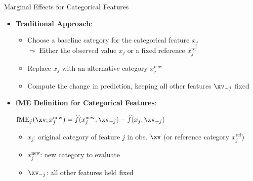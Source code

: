 \documentclass[11pt,compress,t,notes=noshow, aspectratio=169, xcolor=table]{beamer}
\begin{document}
\begin{frame}{Marginal Effects for Categorical Features}
\begin{itemize}
\item \textbf{Traditional Approach}:
\begin{itemize}
  \item Choose a baseline category for the categorical feature \(x_j\) \\
  $\leadsto$ Either the observed value \(x_j\) or a fixed reference \(x_j^\text{ref}\)
  \item Replace \(x_j\) with an alternative category \(x_j^\text{new}\)
  \item Compute the change in prediction, keeping all other features \(\xv_{-j}\) fixed
\end{itemize}

\item \textbf{fME Definition for Categorical Features}:\\
\medskip
\centerline{$
\text{fME}_j(\xv; x_j^\text{new}) = \widehat{f}(x_j^\text{new}, \xv_{-j}) - \widehat{f}(x_j, \xv_{-j})$}
\medskip
\begin{itemize}
\item \(x_j\): original category of feature \(j\) in obs. \(\xv\) (or reference category $x_j^\text{ref}$)
\item \(x_j^\text{new}\): new category to evaluate
\item \(\xv_{-j}\): all other features held fixed
\end{itemize}


\end{itemize}
\end{frame}
\end{document}
